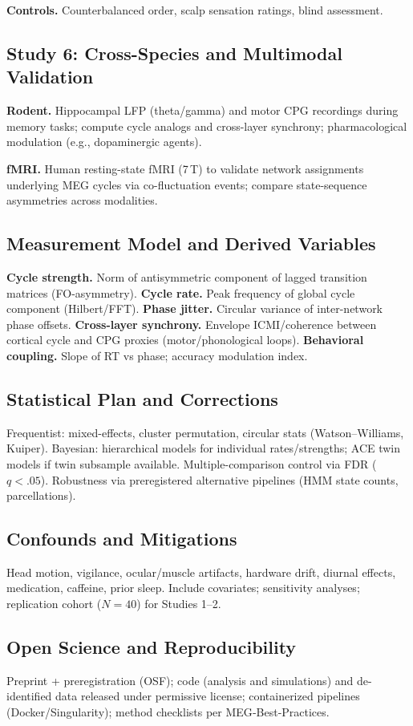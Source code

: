 \documentclass{article}
\begin{document}
\textbf{Controls.} Counterbalanced order, scalp sensation ratings, blind assessment.

\subsection{Study 6: Cross-Species and Multimodal Validation}
\textbf{Rodent.} Hippocampal LFP (theta/gamma) and motor CPG recordings during memory tasks; compute cycle analogs and cross-layer synchrony; pharmacological modulation (e.g., dopaminergic agents).

\textbf{fMRI.} Human resting-state fMRI (7\,T) to validate network assignments underlying MEG cycles via co-fluctuation events; compare state-sequence asymmetries across modalities.

\subsection{Measurement Model and Derived Variables}
\textbf{Cycle strength.} Norm of antisymmetric component of lagged transition matrices (FO-asymmetry).  
\textbf{Cycle rate.} Peak frequency of global cycle component (Hilbert/FFT).  
\textbf{Phase jitter.} Circular variance of inter-network phase offsets.  
\textbf{Cross-layer synchrony.} Envelope ICMI/coherence between cortical cycle and CPG proxies (motor/phonological loops).  
\textbf{Behavioral coupling.} Slope of RT vs phase; accuracy modulation index.

\subsection{Statistical Plan and Corrections}
Frequentist: mixed-effects, cluster permutation, circular stats (Watson--Williams, Kuiper). Bayesian: hierarchical models for individual rates/strengths; ACE twin models if twin subsample available. Multiple-comparison control via FDR ($q{<}.05$). Robustness via preregistered alternative pipelines (HMM state counts, parcellations).

\subsection{Confounds and Mitigations}
Head motion, vigilance, ocular/muscle artifacts, hardware drift, diurnal effects, medication, caffeine, prior sleep. Include covariates; sensitivity analyses; replication cohort ($N{=}40$) for Studies 1--2.

\subsection{Open Science and Reproducibility}
Preprint + preregistration (OSF); code (analysis and simulations) and de-identified data released under permissive license; containerized pipelines (Docker/Singularity); method checklists per MEG‐Best‐Practices.
\end{document}
